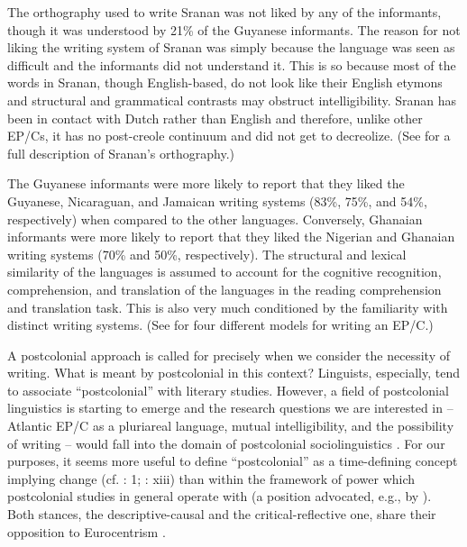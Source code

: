 \documentclass[output=paper,colorlinks,citecolor=brown]{langscibook}
\begin{document}
The orthography used to write Sranan was not liked by any of the informants, though it was understood by 21\% of the Guyanese informants. The reason for not liking the writing system of Sranan was simply because the language was seen as difficult and the informants did not understand it. This is so because most of the words in Sranan, though English-based, do not look like their English etymons and structural and grammatical contrasts may obstruct intelligibility. Sranan has been in contact with Dutch rather than English and therefore, unlike other EP/Cs, it has no post-creole continuum and did not get to decreolize. (See \citealt{Sebba_2000} for a full description of Sranan’s orthography.)

The Guyanese informants were more likely to report that they liked the Guyanese, Nicaraguan, and Jamaican writing systems (83\%, 75\%, and 54\%, respectively) when compared to the other languages. Conversely, Ghanaian informants were more likely to report that they liked the Nigerian and Ghanaian writing systems (70\% and 50\%, respectively). The structural and lexical similarity of the languages is assumed to account for the cognitive recognition, comprehension, and translation of the languages in the reading comprehension and translation task. This is also very much conditioned by the familiarity with distinct writing systems. (See \citealt{Winer_1990} for four different models for writing an EP/C.)

A postcolonial approach is called for precisely when we consider the necessity of writing. What is meant by postcolonial in this context? Linguists, especially, tend to associate “postcolonial” with literary studies. However, a field of postcolonial linguistics is starting to emerge and the research questions we are interested in – Atlantic EP/C as a pluriareal language, mutual intelligibility, and the possibility of writing – would fall into the domain of postcolonial sociolinguistics \citep[cf.][]{Makoni_2011,Levisen_Sippola_2019}. For our purposes, it seems more useful to define “postcolonial” as a time-defining concept implying change (cf. \cite{Calabrese_2015}: 1; \cite{Anchimbe_2018}: xiii) than within the framework of power which postcolonial studies in general operate with (a position advocated, e.g., by \cite{Warnke_2017}). Both stances, the descriptive-causal and the critical-reflective one, share their opposition to Eurocentrism \citep[2]{Levisen_Sippola_2019}. 
\end{document}
